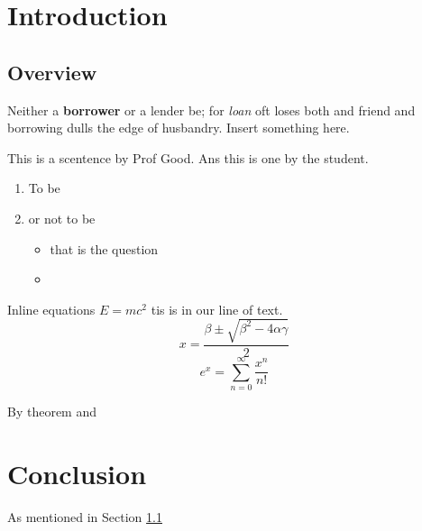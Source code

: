 \chapter{Introduction}

\section{Overview}
\label{Sec:Overview}

Neither a \textbf{borrower} or a lender be; for \textit{loan} oft loses both  and friend and borrowing dulls the edge of husbandry. Insert something here.

This is a scentence by Prof Good. Ans this is one by the student.

\begin{enumerate}
\item To be
\item or not to be
\begin{itemize}
\item that is the question
\item 
\end{itemize}
\end{enumerate}

Inline equations $E=mc^2$ tis is in our line of text.
\[
x = \frac{\beta\pm\sqrt{\beta^2-4\alpha\gamma}}{2}
\]
\[
e^x = \sum_{n=0}^\infty \frac{x^n}{n!}
\]

By theorem \cite{Bunce2003ThePreduals} and \cite[Section 3]{Edwards2003TheSpace}

\chapter{Conclusion}

As mentioned in Section \ref{Sec:Overview} 

